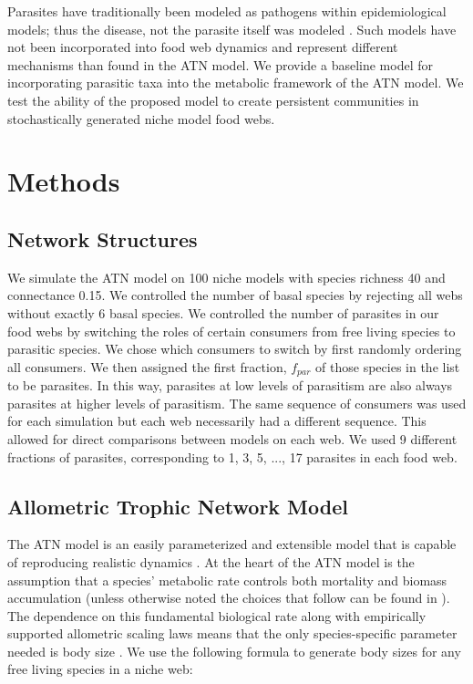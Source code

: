 \documentclass[/home/nkappler/Research/Dissertation/dissertation.tex]{subfiles}
\begin{document}
\begin{bibunit}
Parasites have traditionally been modeled as pathogens within epidemiological
models; thus the disease, not the parasite itself was modeled \cite*{May1991}.
Such models have not been incorporated into food web dynamics and represent
different mechanisms than found in the ATN model. We provide a baseline model
for incorporating parasitic taxa into the metabolic framework of the ATN model.
We test the ability of the proposed model to create persistent communities in
stochastically generated niche model food webs.

\section{Methods}

\subsection{Network Structures}

We simulate the ATN model on 100 niche models with species richness 40 and
connectance 0.15. We controlled the number of basal species by rejecting all
webs without exactly 6 basal species.  We controlled the number of parasites in
our food webs by switching the roles of certain consumers from free living
species to parasitic species. We chose which consumers to switch by first
randomly ordering all consumers. We then assigned the first fraction, $f_{par}$
of those species in the list to be parasites. In this way, parasites at low
levels of parasitism are also always parasites at higher levels of parasitism.
The same sequence of consumers was used for each simulation but each web
necessarily had a different sequence.  This allowed for direct comparisons
between models on each web. We used 9 different fractions of parasites,
corresponding to 1, 3, 5, ..., 17 parasites in each food web.

\subsection{Allometric Trophic Network Model}

The ATN model is an easily parameterized and extensible model that is capable
of reproducing realistic dynamics \cite*{Boit2012}. At the heart of the ATN
model is the assumption that a species' metabolic rate controls both mortality
and biomass accumulation (unless otherwise noted the choices that follow can be
found in \cite*{Brose2006b}). The dependence on this fundamental biological rate
along with empirically supported allometric scaling laws means that the only
species-specific parameter needed is body size \cite*{Brown2004}. We use the
following formula to generate body sizes for any free living species in a niche
web:


\end{bibunit}
\end{document}
